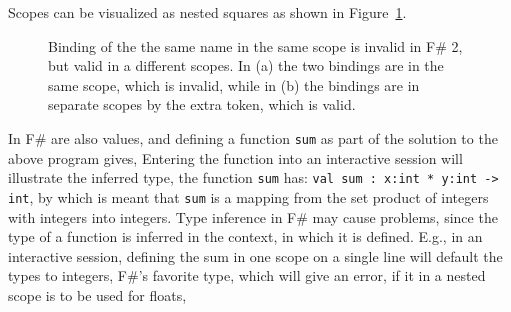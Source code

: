 
%
Scopes can be visualized as nested squares as shown in Figure~\ref{fig:scope}.
\begin{figure}
  \centering
  \caption{Binding of the the same name in the same scope is invalid in F\# 2, but valid in a different scopes. In (a) the two bindings are in the same scope, which is invalid, while in (b) the bindings are in separate scopes by the extra \token{;;} token, which is valid.}
  \label{fig:scope}
\end{figure}

In F\#  are also values, and defining a function \lstinline|sum| as part of the solution to the above program gives,
%
%
Entering the function into an interactive session will illustrate the inferred type, the function \lstinline|sum| has: \lstinline{val sum : x:int * y:int -> int}, by which is meant that \lstinline|sum| is a mapping from the set product of integers with integers into integers. Type inference in F\# may cause problems, since the type of a function is inferred in the context, in which it is defined. E.g., in an interactive session, defining the sum in one scope on a single line will default the types to integers, F\#'s favorite type, which will give an error, if it in a nested scope is to be used for floats,
%


